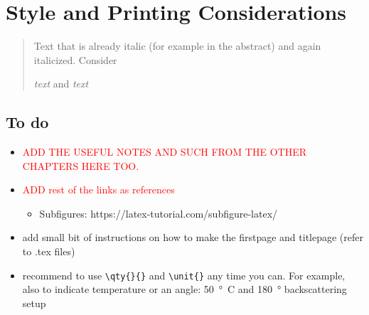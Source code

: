 \documentclass[main_brownies.tex]{subfiles}
\begin{document}
\graphicspath{ {Figures/}{Schemes/} } %
{}%

\checkoddpage
\ifoddpage
\newpage\thispagestyle{empty}
\mbox{}
\newpage
\else
\fi

\chapter[Instructions]{Style and Printing Considerations} %
	
\begin{abstract}
	Text that is already italic (for example in the abstract) and again italicized. Consider 
	\begin{LTXexample}[pos=b,preset=\centering,width=0.5\linewidth]
		\textit{text} and \emph{text}
	\end{LTXexample}
\end{abstract}

\section{To do}
\begin{itemize}
	\item \textcolor{red}{ADD THE USEFUL NOTES AND SUCH FROM THE OTHER CHAPTERS HERE TOO.}
	\item \textcolor{red}{ADD rest of the links as references}
	\begin{itemize}
		\item Subfigures: https://latex-tutorial.com/subfigure-latex/
	\end{itemize}
	\item add small bit of instructions on how to make the firstpage and titlepage (refer to .tex files)
	\item recommend to use \verb*|\qty{}{}| and \verb*|\unit{}| any time you can. For example, also to indicate temperature or an angle: \qty{50}{\degree C} and \qty{180}{\degree} backscattering setup
\end{itemize}
\end{document}
